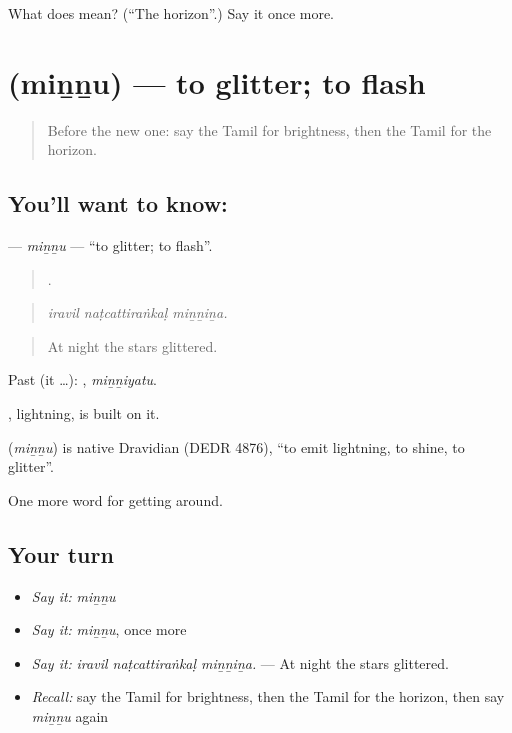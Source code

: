 \begin{tcolorbox}[breakable,colback=teal!4,colframe=teal!35!black,title={Before you move on}]
What does  mean? (\textquotedblleft{}The horizon\textquotedblright{}.) Say it once more.
\end{tcolorbox}
\section[\texorpdfstring{\ta{மின்னு} (miṉṉu)}{மின்னு (miṉṉu)}]{ (miṉṉu) — to glitter; to flash}

\label{lesson:TA-C430-minnu}



\begin{quote}
Before the new one: say the Tamil for brightness, then the Tamil for the horizon.
\end{quote}

\subsection*{You'll want to know: }
\textbf{} — \emph{miṉṉu} — \textquotedblleft{}to glitter; to flash\textquotedblright{}.

\begin{quote}
  .
\end{quote}

\begin{quote}
\emph{iravil naṭcattiraṅkaḷ miṉṉiṉa.}
\end{quote}

\begin{quote}
At night the stars glittered.
\end{quote}

Past (it …): , \emph{miṉṉiyatu}.

, lightning, is built on it.

\begin{cousinweb}
\textbf{} (\emph{miṉṉu}) is native Dravidian (DEDR 4876), \textquotedblleft{}to emit lightning, to shine, to glitter\textquotedblright{}.
\end{cousinweb}

\begin{grammarlens}[title={What you've built}]
One more word for getting around.
\end{grammarlens}

\subsection*{Your turn}
\begin{itemize}
\raggedright
  \item \emph{Say it:} \emph{miṉṉu}
  \item \emph{Say it:} \emph{miṉṉu}, once more
  \item \emph{Say it:} \emph{iravil naṭcattiraṅkaḷ miṉṉiṉa.} — At night the stars glittered.
  \item \emph{Recall:} say the Tamil for brightness, then the Tamil for the horizon, then say \emph{miṉṉu} again
\end{itemize}

